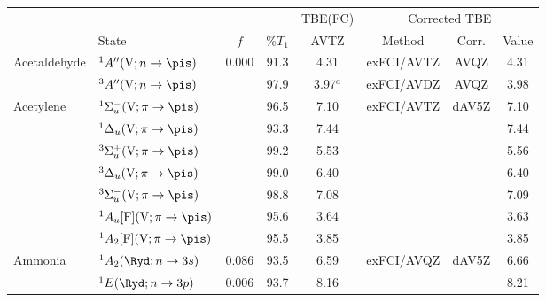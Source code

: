 \newcommand{\TDDFT}{TD-DFT}
\newcommand{\CASSCF}{CASSCF}
\newcommand{\CASPT}{CASPT2}
\newcommand{\ADC}[1]{ADC(#1)}
\newcommand{\CC}[1]{CC#1}
\newcommand{\CCSD}{CCSD}
\newcommand{\EOMCCSD}{EOM-CCSD}
\newcommand{\CCSDT}{CCSDT}
\newcommand{\CCSDTQ}{CCSDTQ}
\newcommand{\CCSDTQP}{CCSDTQP}
\newcommand{\CI}{CI}
\newcommand{\sCI}{sCI}
\newcommand{\exCI}{exFCI}
\newcommand{\FCI}{FCI}

\newcommand{\AVDZ}{\emph{aug}-cc-pVDZ}
\newcommand{\AVTZ}{\emph{aug}-cc-pVTZ}
\newcommand{\DAVTZ}{d-\emph{aug}-cc-pVTZ}
\newcommand{\AVQZ}{\emph{aug}-cc-pVQZ}
\newcommand{\DAVQZ}{d-\emph{aug}-cc-pVQZ}
\newcommand{\TAVQZ}{t-\emph{aug}-cc-pVQZ}
\newcommand{\AVPZ}{\emph{aug}-cc-pV5Z}
\newcommand{\DAVPZ}{d-\emph{aug}-cc-pV5Z}
\newcommand{\PopleDZ}{6-31+G(d)}

\begin{tabular}{llcccccc}
        &		&	&		& TBE(FC)&  \multicolumn{3}{c}{Corrected TBE} \\
        & State	 & $f$ & \%$T_1$ & 	AVTZ	& Method & Corr.	& Value \\
  Acetaldehyde	&$^1A''(\mathrm{V};n \rightarrow \pis)$					& 0.000	&91.3& 4.31		& {\exCI}/AVTZ & AVQZ		&4.31	\\
        &$^3A''(\mathrm{V};n \rightarrow \pis)$					&		&97.9& 3.97$^a$ 	& {\exCI}/AVDZ & AVQZ		&3.98	\\
  Acetylene		&$^1\Sigma_u^- (\mathrm{V};\pi \rightarrow \pis)$ 			&		&96.5& 7.10		& {\exCI}/AVTZ & dAV5Z	 	&7.10 	\\
        &$^1\Delta_u	(\mathrm{V};\pi \rightarrow \pis)$ 			&		&93.3& 7.44		&			&			&7.44 	\\	
        &$^3\Sigma_u^+ (\mathrm{V};\pi \rightarrow \pis)$ 			&		&99.2& 5.53		&			&			&5.56 	\\	
        &$^3\Delta_u	(\mathrm{V};\pi \rightarrow \pis)$ 			&		&99.0& 6.40		&			&			&6.40 	\\	
        &$^3\Sigma_u^- (\mathrm{V};\pi \rightarrow \pis)$ 			&		&98.8& 7.08		&			&			&7.09 	\\	
        &$^1A_u [\mathrm{F}]	(\mathrm{V};\pi \rightarrow \pis)$	&		&95.6& 3.64		&			&			&3.63 	\\	
        &$^1A_2 [\mathrm{F}]	(\mathrm{V};\pi \rightarrow \pis)$	&		&95.5& 3.85		&			&			&3.85	\\	
  Ammonia		&$^1A_2 (\Ryd;n \rightarrow 3s)$ 						& 0.086	&93.5& 6.59		&{\exCI}/AVQZ & dAV5Z		&6.66 	\\
        &$^1E (\Ryd;n \rightarrow 3p)$ 							& 0.006	&93.7& 8.16		&			&			&8.21	\\	

\end{tabular}
